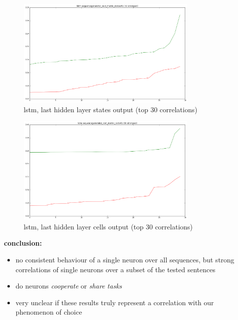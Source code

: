 \begin{frame}{\expv}
	\begin{figure}
		\includegraphics[width=250pt,height=150pt]{gfx/lstmstates.png}
		\caption{lstm, last hidden layer states output (top 30 correlations)}
	\end{figure}
\end{frame}
\begin{frame}{\expv}
\begin{figure}
	\includegraphics[width=250pt,height=150pt]{gfx/lstm.png}
	\caption{lstm, last hidden layer cells output (top 30 correlations)}
\end{figure}
\end{frame}
\begin{frame}{\expv}
	\textbf{conclusion:}
	\begin{itemize}
		\item no consistent behaviour of a single neuron over all sequences, but strong correlations of single neurons over a subset of the tested sentences
		\item do neurons \textit{cooperate} or \textit{share tasks}
		\item very unclear if these results truly represent a correlation with our phenomenon of choice
	\end{itemize}
\end{frame}